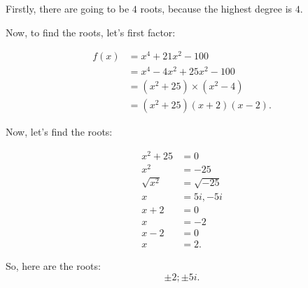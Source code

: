\begin{question}[Determine how many, what type, and find the roots for: \\
  $f(x) = x^{4} + 21x^2 - 100$]

  Firstly, there are going to be $4$ roots, because the highest degree is $4$.

  Now, to find the roots, let's first factor:

  \begin{align}
    f(x)  &= x^{4} + 21x^2 - 100 \\
          &= x^{4} - 4x^2 + 25x^2 - 100 \\
          &= (x^2 + 25) \times (x^2 - 4) \\
          &= \boxed{(x^2 + 25)(x + 2)(x - 2)}
  .\end{align}

  Now, let's find the roots:

  \begin{align}
    x^2 + 25    &= 0             \\
    x^2         &= -25           \\
    \sqrt{x^2}  &= \sqrt{-25}            \\
    x           &= 5i, -5i      \\
    x + 2       &= 0            \\
    x           &= -2           \\
    x - 2       &= 0            \\
    x           &= 2
  .\end{align}

  So, here are the roots:
  \[ \pm 2; \pm 5i .\]
\end{question}

